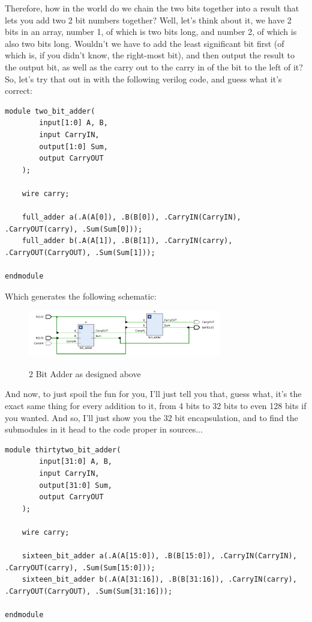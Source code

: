 \documentclass{article}
\begin{document}
Therefore, how in the world do we chain the two bits together into a result that lets you add two 2 bit numbers together? Well, let's think about it, we have 2 bits in an array, number 1, of which is two bits long, and number 2, of which is also two bits long. Wouldn't we have to add the least significant bit first (of which is, if you didn't know, the right-most bit), and then output the result to the output bit, as well as the carry out to the carry in of the bit to the left of it? So, let's try that out in with the following verilog code, and guess what it's correct:
\begin{lstlisting}[caption={2 Bit Adder Verilog Code}, label={2 Bit Adder Verilog}, style=Verilog]
module two_bit_adder(
        input[1:0] A, B,
        input CarryIN,
        output[1:0] Sum,
        output CarryOUT
    );
    
    wire carry;
    
    full_adder a(.A(A[0]), .B(B[0]), .CarryIN(CarryIN), .CarryOUT(carry), .Sum(Sum[0]));
    full_adder b(.A(A[1]), .B(B[1]), .CarryIN(carry), .CarryOUT(CarryOUT), .Sum(Sum[1]));
    
endmodule
\end{lstlisting}

Which generates the following schematic:
\begin{figure}[!htbp]
    \centering
    \caption{2 Bit Adder as designed above}
    \includegraphics[width=0.75\textwidth]{pictures/part1/two_bit_adder.png}
    \label{2 Bit Adder}
\end{figure}

And now, to just spoil the fun for you, I'll just tell you that, guess what, it's the exact same thing for every addition to it, from 4 bits to 32 bits to even 128 bits if you wanted. And so, I'll just show you the 32 bit encapsulation, and to find the submodules in it head to the code proper in sources...\newpage
\begin{lstlisting}[caption={32 Bit Adder Verilog Code}, label={32 Bit Adder Verilog}, style=Verilog]
module thirtytwo_bit_adder(
        input[31:0] A, B,
        input CarryIN,
        output[31:0] Sum,
        output CarryOUT
    );
    
    wire carry;
    
    sixteen_bit_adder a(.A(A[15:0]), .B(B[15:0]), .CarryIN(CarryIN), .CarryOUT(carry), .Sum(Sum[15:0]));
    sixteen_bit_adder b(.A(A[31:16]), .B(B[31:16]), .CarryIN(carry), .CarryOUT(CarryOUT), .Sum(Sum[31:16]));
    
endmodule
\end{lstlisting}
\end{document}
